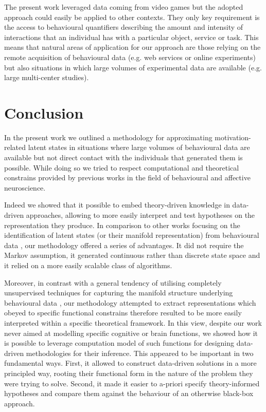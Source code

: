 The present work leveraged data coming from video games but the adopted approach could easily be applied to other contexts. They only key requirement is the access to behavioural quantifiers describing the amount and intensity of interactions that an individual has with a particular object, service or task. This means that natural areas of application for our approach are those relying on the remote acquisition of behavioural data (e.g. web services or online experiments) but also situations in which large volumes of experimental data are available (e.g. large multi-center studies). 

\section{Conclusion}
In the present work we outlined a methodology for approximating motivation-related latent states in situations where large volumes of behavioural data are available but not direct contact with the individuals that generated them is possible. While doing so we tried to respect computational and theoretical constrains provided by previous works in the field of behavioural and affective neuroscience. 

Indeed we showed that it possible to embed theory-driven knowledge in data-driven approaches, allowing to more easily interpret and test hypotheses on the representation they produce. In comparison to other works focusing on the identification of latent states (or their manifold representation) from behavioural data \citep{calhoun2019unsupervised, luxem2020identifying, pereira2020quantifying, shi2021learning, mccullough2021unsupervised}, our methodology offered a series of advantages. It did not require the Markov assumption, it generated continuous rather than discrete state space and it relied on a more easily scalable class of algorithms. 

Moreover, in contrast with a general tendency of utilising completely unsupervised techniques for capturing the manifold structure underlying behavioural data \citep{calhoun2019unsupervised, luxem2020identifying, pereira2020quantifying, shi2021learning, mccullough2021unsupervised}, our methodology attempted to extract representations which obeyed to specific functional constrains therefore resulted to be more easily interpreted within a specific theoretical framework. In this view, despite our work never aimed at modelling specific cognitive or brain functions, we showed how it is possible to leverage computation model of such functions for designing data-driven methodologies for their inference. This appeared to be important in two fundamental ways. First, it allowed to construct data-driven solutions in a more principled way, rooting their functional form in the nature of the problem they were trying to solve. Second, it made it easier to a-priori specify theory-informed hypotheses and compare them against the behaviour of an otherwise black-box approach.

